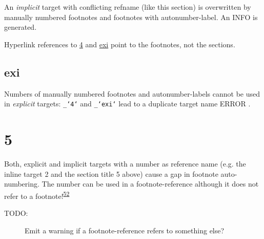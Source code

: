 \documentclass[a4paper]{article}
\begin{document}
An \emph{implicit} target with conflicting refname (like this section) is
overwritten by manually numbered footnotes and footnotes with
autonumber-label. An INFO is generated.

Hyperlink references to \hyperref[footnote-1]{4} and \hyperref[exi]{exi} point to the footnotes, not the
sections.


\subsection{exi}

Numbers of manually numbered footnotes and autonumber-labels
cannot be used in \emph{explicit} targets:
\texttt{\_`4`} and \texttt{\_`exi`} lead to a \textquotedbl{}duplicate target name\textquotedbl{} ERROR .


\section{5%
  \label{section-2}%
}

Both, explicit and implicit targets with a number as reference name
(e.g. the inline target \textquotedbl{}%
\label{target-4}2\textquotedbl{} and the section title \textquotedbl{}5\textquotedbl{} above)
cause a gap in footnote auto-numbering. The number can be used in a
footnote-reference although it does not refer to a footnote!\textsuperscript{\hyperref[section-2]{5}}\textsuperscript{\hyperref[target-4]{2}}

\begin{description}
\item[{TODO:}] 
Emit a warning if a footnote-reference refers to something else?
\end{description}
\end{document}
